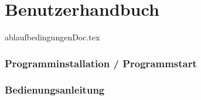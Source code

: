
\part{Benutzerhandbuch}

{ablaufbedingungenDoc.tex}
\section{Programminstallation / Programmstart}
\section{Bedienungsanleitung}